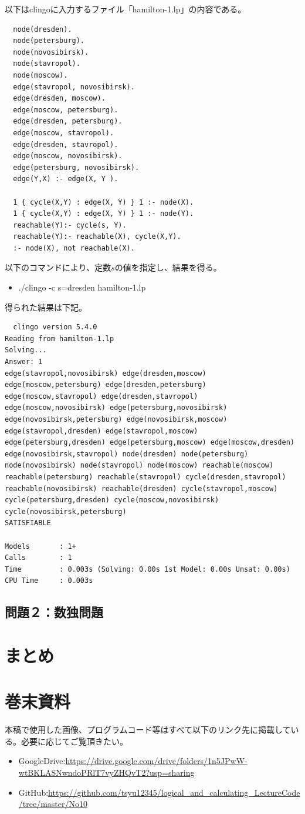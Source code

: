 \documentclass[dvipdfmx]{jsarticle}
\begin{document}
以下はclingoに入力するファイル「hamilton-1.lp」の内容である。
\begin{verbatim}
  node(dresden).
  node(petersburg).
  node(novosibirsk).
  node(stavropol).
  node(moscow).
  edge(stavropol, novosibirsk).
  edge(dresden, moscow).
  edge(moscow, petersburg).
  edge(dresden, petersburg).
  edge(moscow, stavropol).
  edge(dresden, stavropol).
  edge(moscow, novosibirsk).
  edge(petersburg, novosibirsk).
  edge(Y,X) :- edge(X, Y ).

  1 { cycle(X,Y) : edge(X, Y) } 1 :- node(X).
  1 { cycle(X,Y) : edge(X, Y) } 1 :- node(Y).
  reachable(Y):- cycle(s, Y).
  reachable(Y):- reachable(X), cycle(X,Y).
  :- node(X), not reachable(X).
\end{verbatim}
以下のコマンドにより、定数$s$の値を指定し、結果を得る。
\begin{itemize}
  \item ./clingo -c s=dresden hamilton-1.lp
\end{itemize}
得られた結果は下記。
\begin{verbatim}
  clingo version 5.4.0
Reading from hamilton-1.lp
Solving...
Answer: 1
edge(stavropol,novosibirsk) edge(dresden,moscow) edge(moscow,petersburg) edge(dresden,petersburg) edge(moscow,stavropol) edge(dresden,stavropol) edge(moscow,novosibirsk) edge(petersburg,novosibirsk) edge(novosibirsk,petersburg) edge(novosibirsk,moscow) edge(stavropol,dresden) edge(stavropol,moscow) edge(petersburg,dresden) edge(petersburg,moscow) edge(moscow,dresden) edge(novosibirsk,stavropol) node(dresden) node(petersburg) node(novosibirsk) node(stavropol) node(moscow) reachable(moscow) reachable(petersburg) reachable(stavropol) cycle(dresden,stavropol) reachable(novosibirsk) reachable(dresden) cycle(stavropol,moscow) cycle(petersburg,dresden) cycle(moscow,novosibirsk) cycle(novosibirsk,petersburg)
SATISFIABLE

Models       : 1+
Calls        : 1
Time         : 0.003s (Solving: 0.00s 1st Model: 0.00s Unsat: 0.00s)
CPU Time     : 0.003s

\end{verbatim}
\subsection{問題２：数独問題}

\section{まとめ}
\section{巻末資料}
本稿で使用した画像、プログラムコード等はすべて以下のリンク先に掲載している。必要に応じてご覧頂きたい。
\begin{itemize}
  \item GoogleDrive:\url{https://drive.google.com/drive/folders/1n5JPwW-wtBKLASNwndoPRlT7vyZHQvT2?usp=sharing}
  \item GitHub:\url{https://github.com/tsyu12345/logical_and_calculating_LectureCode/tree/master/No10}
\end{itemize}
\end{document}

